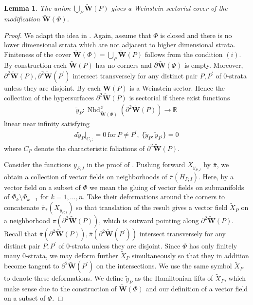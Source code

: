 \documentclass[a4paper,12pt, twoside, pdftex]{amsart}
\newtheorem{lemma}[dummy]{Lemma}
\theoremstyle{definition}
\numberwithin{equation}{section}
\newcommand{\pref}{\prettyref}
\newcommand{\del}{\partial}
\newcommand{\Nbd}{\operatorname{Nbd}}
\newcommand{\bR}{\mathbb{R}}
\newcommand{\bfW}{\mathbf{W}}
\begin{document}
\begin{lemma} \label{lem:W-SC}
The union
$\bigcup_{P} \widetilde{\bfW}(P)$
gives a Weinstein sectorial cover of the modification
$\widetilde{\bfW}(\Phi)$.
\end{lemma}
\begin{proof}
We adapt the idea in
\cite[Example 1.34]{GPS2}.
Again,
assume that
$\Phi$
is closed
and
there is no lower dimensional strata
which are not adjacent to higher dimensional strata.
Finiteness of the cover
$\widetilde{\bfW}(\Phi)
=
\bigcup_{P} \widetilde{\bfW}(P)$
follows from the condition
$(i)$.
By construction each
$\widetilde{\bfW}(P)$
has no corners
and
$\del \widetilde{\bfW}(\Phi)$
is empty.
Moreover,
$\del^2 \widetilde{\bfW}(P), \del^2 \widetilde{\bfW}(P^\prime)$
intersect transversely for any distinct pair
$P, P^\prime$
of $0$-strata
unless they are disjoint.
By
\pref{lem:W-sector}
each
$\widetilde{\bfW}(P)$
is a Weinstein sector.
Hence the collection of the hypersurfaces 
$\del^2 \widetilde{\bfW}(P)$
is sectorial
if there exist functions
\begin{align*}
\tilde{y}_{P}
\colon
\Nbd^Z_{\widetilde{\bfW}(\Phi)}(\del^2 \widetilde{\bfW}(P))
\to
\bR
\end{align*}
linear near infinity satisfying
\begin{align*}
d \tilde{y}_{P} |_{C_{P^\prime}} = 0 \ \text{for} \ P \neq P^\prime, \
\{ \tilde{y}_{P}, \tilde{y}_{P^\prime} \} = 0
\end{align*}
where
$C_P$
denote the characteristic foliations of
$\del^2 \widetilde{\bfW}(P)$.

Consider the functions
$y_{P, I}$
in the proof of
\pref{lem:W-sector}.
Pushing forward
$X_{y_{P, I}}$
by
$\bar{\pi}$,
we obtain a collection of vector fields on neighborhoods of
$\bar{\pi}(H_{P, I})$.
Here,
by a vector field on a subset of
$\Phi$
we mean the gluing of vector fields on submanifolds of
$\Phi_k \setminus \Phi_{k-1}$
for
$k = 1, \ldots, n$.
Take their deformations around the corners to concatenate
$\bar{\pi}_*(X_{y_{P, I}})$
so that
translation of the result gives a vector field
$\tilde{X}_P$
on a neighborhood
$\bar{\pi}(\del^2 \widetilde{\bfW}(P))$,
which is outward pointing along
$\del^2 \widetilde{\bfW}(P)$.
Recall that
$\bar{\pi}(\del^2 \widetilde{\bfW}(P)),
\bar{\pi}(\del^2 \widetilde{\bfW}(P^\prime))$
intersect transversely for any distinct pair
$P, P^\prime$
of $0$-strata
unless they are disjoint.
Since
$\Phi$
has only finitely many $0$-strata,
we may deform further
$\tilde{X}_P$
simultaneously
so that
they in addition become tangent to
$\del^2 \widetilde{\bfW}(P^\prime)$
on the intersections.
We use the same symbol
$\tilde{X}_P$
to denote these deformations.
We define
$\tilde{y}_{P}$
as the Hamiltonian lifts of
$\tilde{X}_P$,
which make sense due to the construction of
$\widetilde{\bfW}(\Phi)$
and
our definition of a vector field on a subset of
$\Phi$.


\end{proof}
\end{document}
